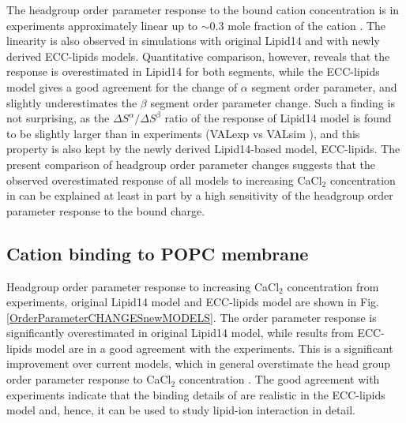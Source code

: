 \documentclass[aip,jcp,twocolumn]{revtex4}
\begin{document}
The headgroup order parameter response to the bound cation concentration
is in experiments approximately linear up to $\sim$0.3 mole fraction of the cation \cite{scherer89}.
The linearity is also observed in simulations with original Lipid14 and with newly derived ECC-lipids models.
Quantitative comparison, however, reveals that the response is overestimated in 
Lipid14 for both segments, while the ECC-lipids model gives a
good agreement for the change of $\alpha$ segment order parameter, and slightly
underestimates the $\beta$ segment order parameter change.
Such a finding is not surprising, as the $\Delta S^\alpha/\Delta S^\beta$ ratio 
of the response of Lipid14 model is found to be slightly larger than in 
experiments (VALexp vs VALsim
), and this property is also kept by the newly derived Lipid14-based model, ECC-lipids. 
The present comparison of headgroup order parameter changes 
suggests that the observed overestimated response of all models to 
increasing CaCl$_2$ concentration in \cite{catte16} 
can be explained at least in part by a high sensitivity of the headgroup order parameter response
to the bound charge.






\subsection{Cation binding to POPC membrane}

Headgroup order parameter response to increasing CaCl$_2$ concentration
from experiments, original Lipid14 model and ECC-lipids model are shown
in Fig. \ref{OrderParameterCHANGESnewMODELS}. The order parameter response
is significantly overestimated in original Lipid14 model, while results from
ECC-lipids model are in a good agreement with the experiments.
This is a significant improvement over current models,
which in general overstimate the head group order parameter response to CaCl$_2$
concentration \cite{catte16}. The good agreement with experiments indicate
that the binding details of  are realistic in the ECC-lipids model
and, hence, it can be used to study lipid-ion interaction in detail.
\end{document}
